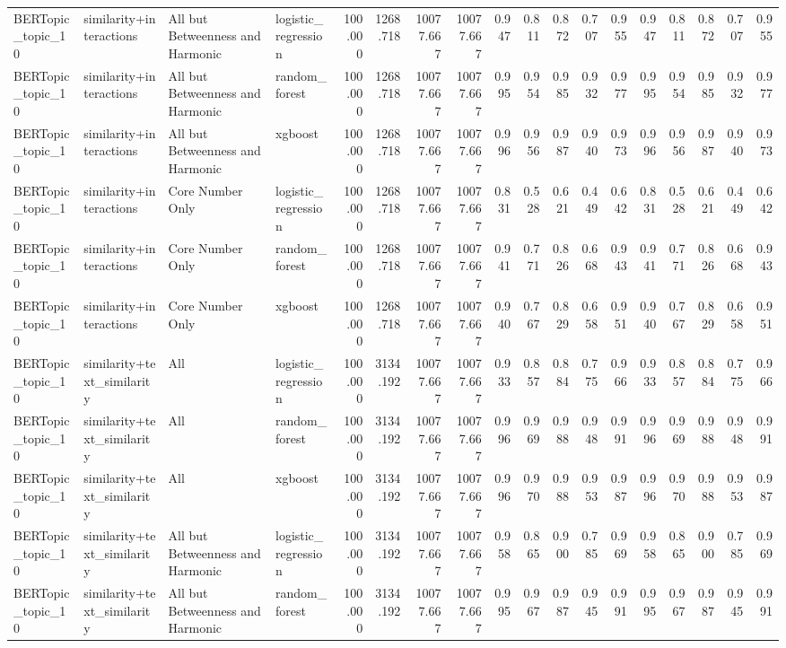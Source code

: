 \begin{tabular}{llllrrrrrrrrrrrrrr}
BERTopic_topic_10 & similarity+interactions & All but Betweenness and Harmonic & logistic_regression & 100.000 & 1268.718 & 10077.667 & 10077.667 & 0.947 & 0.811 & 0.872 & 0.707 & 0.955 & 0.947 & 0.811 & 0.872 & 0.707 & 0.955 \\
BERTopic_topic_10 & similarity+interactions & All but Betweenness and Harmonic & random_forest & 100.000 & 1268.718 & 10077.667 & 10077.667 & 0.995 & 0.954 & 0.985 & 0.932 & 0.977 & 0.995 & 0.954 & 0.985 & 0.932 & 0.977 \\
BERTopic_topic_10 & similarity+interactions & All but Betweenness and Harmonic & xgboost & 100.000 & 1268.718 & 10077.667 & 10077.667 & 0.996 & 0.956 & 0.987 & 0.940 & 0.973 & 0.996 & 0.956 & 0.987 & 0.940 & 0.973 \\
BERTopic_topic_10 & similarity+interactions & Core Number Only & logistic_regression & 100.000 & 1268.718 & 10077.667 & 10077.667 & 0.831 & 0.528 & 0.621 & 0.449 & 0.642 & 0.831 & 0.528 & 0.621 & 0.449 & 0.642 \\
BERTopic_topic_10 & similarity+interactions & Core Number Only & random_forest & 100.000 & 1268.718 & 10077.667 & 10077.667 & 0.941 & 0.771 & 0.826 & 0.668 & 0.943 & 0.941 & 0.771 & 0.826 & 0.668 & 0.943 \\
BERTopic_topic_10 & similarity+interactions & Core Number Only & xgboost & 100.000 & 1268.718 & 10077.667 & 10077.667 & 0.940 & 0.767 & 0.829 & 0.658 & 0.951 & 0.940 & 0.767 & 0.829 & 0.658 & 0.951 \\
BERTopic_topic_10 & similarity+text_similarity & All & logistic_regression & 100.000 & 3134.192 & 10077.667 & 10077.667 & 0.933 & 0.857 & 0.884 & 0.775 & 0.966 & 0.933 & 0.857 & 0.884 & 0.775 & 0.966 \\
BERTopic_topic_10 & similarity+text_similarity & All & random_forest & 100.000 & 3134.192 & 10077.667 & 10077.667 & 0.996 & 0.969 & 0.988 & 0.948 & 0.991 & 0.996 & 0.969 & 0.988 & 0.948 & 0.991 \\
BERTopic_topic_10 & similarity+text_similarity & All & xgboost & 100.000 & 3134.192 & 10077.667 & 10077.667 & 0.996 & 0.970 & 0.988 & 0.953 & 0.987 & 0.996 & 0.970 & 0.988 & 0.953 & 0.987 \\
BERTopic_topic_10 & similarity+text_similarity & All but Betweenness and Harmonic & logistic_regression & 100.000 & 3134.192 & 10077.667 & 10077.667 & 0.958 & 0.865 & 0.900 & 0.785 & 0.969 & 0.958 & 0.865 & 0.900 & 0.785 & 0.969 \\
BERTopic_topic_10 & similarity+text_similarity & All but Betweenness and Harmonic & random_forest & 100.000 & 3134.192 & 10077.667 & 10077.667 & 0.995 & 0.967 & 0.987 & 0.945 & 0.991 & 0.995 & 0.967 & 0.987 & 0.945 & 0.991 \\

\end{tabular}
